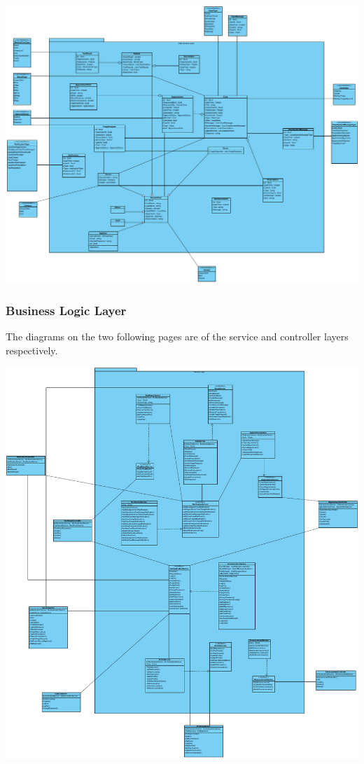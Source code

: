 \documentclass[a4paper, 12pt, titlepage]{article}
\begin{document}
  \includegraphics[width=\linewidth]{dataaccess}

  \subsubsection{Business Logic Layer}

  The diagrams on the two following pages are of the service and controller layers respectively.

  \includegraphics[width=\linewidth]{businesslogic}
\end{document}

